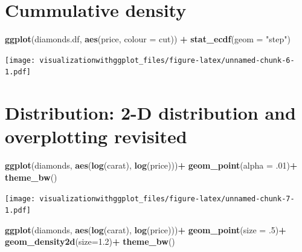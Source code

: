 \documentclass[]{krantz}
\makeatletter
\newenvironment{Shaded}{\begin{snugshade}}{\end{snugshade}}
\newcommand{\KeywordTok}[1]{\textcolor[rgb]{0.13,0.29,0.53}{\textbf{#1}}}
\newcommand{\DataTypeTok}[1]{\textcolor[rgb]{0.13,0.29,0.53}{#1}}
\newcommand{\DecValTok}[1]{\textcolor[rgb]{0.00,0.00,0.81}{#1}}
\newcommand{\FloatTok}[1]{\textcolor[rgb]{0.00,0.00,0.81}{#1}}
\newcommand{\StringTok}[1]{\textcolor[rgb]{0.31,0.60,0.02}{#1}}
\newcommand{\OperatorTok}[1]{\textcolor[rgb]{0.81,0.36,0.00}{\textbf{#1}}}
\newcommand{\NormalTok}[1]{#1}
\newenvironment{kframe}{%
\medskip{}
\setlength{\fboxsep}{.8em}
 \def\at@end@of@kframe{}%
 \ifinner\ifhmode%
  \def\at@end@of@kframe{\end{minipage}}%
  \begin{minipage}{\columnwidth}%
 \fi\fi%
 \def\FrameCommand##1{\hskip\@totalleftmargin \hskip-\fboxsep
 \colorbox{shadecolor}{##1}\hskip-\fboxsep
     \hskip-\linewidth \hskip-\@totalleftmargin \hskip\columnwidth}%
 \MakeFramed {\advance\hsize-\width
   \@totalleftmargin\z@ \linewidth\hsize
   \@setminipage}}%
 {\par\unskip\endMakeFramed%
 \at@end@of@kframe}
\renewenvironment{Shaded}{\begin{kframe}}{\end{kframe}}
\theoremstyle{definition}
\theoremstyle{definition}
\theoremstyle{definition}
\theoremstyle{remark}
\makeatother
\begin{document}
\section{Cummulative density}\label{cummulative-density-1}

\begin{Shaded}
\begin{Highlighting}[]
\KeywordTok{ggplot}\NormalTok{(diamonds.df, }\KeywordTok{aes}\NormalTok{(price, }\DataTypeTok{colour =}\NormalTok{ cut)) }\OperatorTok{+}\StringTok{ }
\StringTok{  }\KeywordTok{stat_ecdf}\NormalTok{(}\DataTypeTok{geom =} \StringTok{"step"}\NormalTok{)}
\end{Highlighting}
\end{Shaded}

\texttt{[image: visualizationwithggplot\_files/figure-latex/unnamed-chunk-6-1.pdf]}

\section{Distribution: 2-D distribution and overplotting
revisited}\label{distribution-2-d-distribution-and-overplotting-revisited}

\begin{Shaded}
\begin{Highlighting}[]
\KeywordTok{ggplot}\NormalTok{(diamonds, }\KeywordTok{aes}\NormalTok{(}\KeywordTok{log}\NormalTok{(carat), }\KeywordTok{log}\NormalTok{(price)))}\OperatorTok{+}
\StringTok{  }\KeywordTok{geom_point}\NormalTok{(}\DataTypeTok{alpha =}\NormalTok{ .}\DecValTok{01}\NormalTok{)}\OperatorTok{+}\StringTok{ }
\StringTok{  }\KeywordTok{theme_bw}\NormalTok{()}
\end{Highlighting}
\end{Shaded}

\texttt{[image: visualizationwithggplot\_files/figure-latex/unnamed-chunk-7-1.pdf]}

\begin{Shaded}
\begin{Highlighting}[]
\KeywordTok{ggplot}\NormalTok{(diamonds, }\KeywordTok{aes}\NormalTok{(}\KeywordTok{log}\NormalTok{(carat), }\KeywordTok{log}\NormalTok{(price)))}\OperatorTok{+}
\StringTok{  }\KeywordTok{geom_point}\NormalTok{(}\DataTypeTok{size =}\NormalTok{ .}\DecValTok{5}\NormalTok{)}\OperatorTok{+}\StringTok{ }
\StringTok{  }\KeywordTok{geom_density2d}\NormalTok{(}\DataTypeTok{size=}\FloatTok{1.2}\NormalTok{)}\OperatorTok{+}
\StringTok{  }\KeywordTok{theme_bw}\NormalTok{()}
\end{Highlighting}
\end{Shaded}
\end{document}
